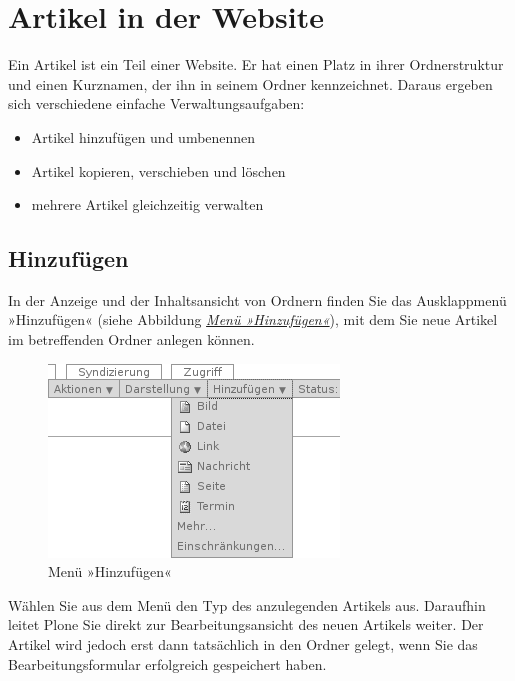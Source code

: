 \documentclass[a4paper,12pt,ngerman]{manual}
\begin{document}
\resetcurrentobjects
\hypertarget{--doc-umgang/verwaltung}{}

\hypertarget{sec-verwaltung}{}\section{Artikel in der Website}

Ein Artikel ist ein Teil einer Website. Er hat einen Platz in ihrer
Ordnerstruktur und einen Kurznamen, der ihn in seinem Ordner
kennzeichnet. Daraus ergeben sich verschiedene einfache Verwaltungsaufgaben:
\begin{itemize}
\item {} 
Artikel hinzufügen und umbenennen

\item {} 
Artikel kopieren, verschieben und löschen

\item {} 
mehrere Artikel gleichzeitig verwalten

\end{itemize}


\hypertarget{sec-artikel-erstellen}{}\subsection{Hinzufügen}

In der Anzeige und der Inhaltsansicht von Ordnern finden Sie das
Ausklappmenü »Hinzufügen« (siehe Abbildung \hyperlink{fig-hinzufuegen}{\emph{Menü »Hinzufügen«}}),
mit dem Sie neue Artikel im betreffenden Ordner anlegen können.
\hypertarget{fig-hinzufuegen}{}\begin{figure}[htbp]
\centering

\includegraphics{hinzufuegen.png}
\caption{Menü »Hinzufügen«}\end{figure}

Wählen Sie aus dem Menü den Typ des anzulegenden Artikels aus. Daraufhin
leitet Plone Sie direkt zur Bearbeitungsansicht des neuen Artikels weiter.
Der Artikel wird jedoch erst dann tatsächlich in den Ordner gelegt,
wenn Sie das Bearbeitungsformular erfolgreich gespeichert haben.
\end{document}
